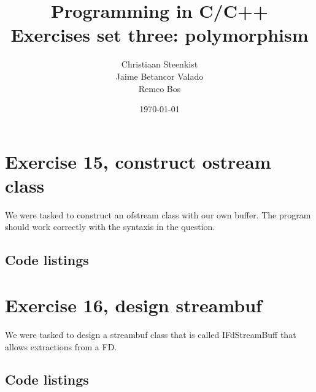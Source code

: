 \documentclass[11pt]{article}
\begin{document}
\title{Programming in C/C++ \\
       Exercises set three: polymorphism
}
\date{\today}
\author{Christiaan Steenkist \\
Jaime Betancor Valado \\
Remco Bos \\
}

\maketitle
\section*{Exercise 15, construct ostream class}
We were tasked to construct an ofstream class with our own buffer. The program should work correctly with the syntaxis in the question.

\subsection*{Code listings}









\section*{Exercise 16, design streambuf}
We were tasked to design a streambuf class that is called IFdStreamBuff that allows extractions from a FD.

\subsection*{Code listings}












\end{document}
